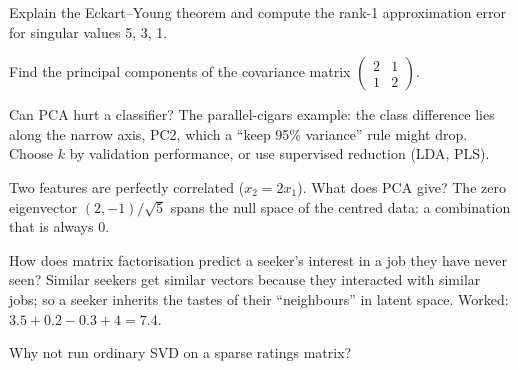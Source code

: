 \begin{qa}{Explain the Eckart--Young theorem and compute the rank-1 approximation error for singular values 5, 3, 1.}
\end{qa}

\begin{qa}{Find the principal components of the covariance matrix $\begin{pmatrix}2 & 1\\1 & 2\end{pmatrix}$.}
\end{qa}

\begin{qa}{\deep Can PCA hurt a classifier?}
\why The parallel-cigars example: the class difference lies along the narrow axis, PC2, which a ``keep 95\% variance'' rule might drop. Choose $k$ by
validation performance, or use supervised reduction (LDA, PLS).
\end{qa}

\begin{qa}{\deep Two features are perfectly correlated ($x_2 = 2x_1$). What does PCA give?}
\why The zero eigenvector $(2, -1)/\sqrt5$ spans the null space of the centred data: a combination that is always 0.
\end{qa}

\begin{qa}{How does matrix factorisation predict a seeker's interest in a job they have never seen?}
\why Similar seekers get similar vectors because they interacted with similar jobs; so a seeker inherits the tastes of their ``neighbours'' in latent
space. Worked: $3.5 + 0.2 - 0.3 + 4 = 7.4$.
\end{qa}

\begin{qa}{Why not run ordinary SVD on a sparse ratings matrix?}
\end{qa}

